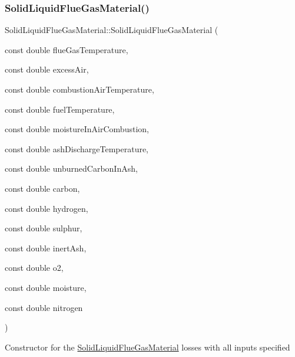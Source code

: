 \subsubsection{\texorpdfstring{Solid\+Liquid\+Flue\+Gas\+Material()}{SolidLiquidFlueGasMaterial()}\hspace{0.1cm}{\footnotesize\ttfamily [2/3]}}
{\footnotesize\ttfamily Solid\+Liquid\+Flue\+Gas\+Material\+::\+Solid\+Liquid\+Flue\+Gas\+Material (\begin{DoxyParamCaption}\item[{const double}]{flue\+Gas\+Temperature,  }\item[{const double}]{excess\+Air,  }\item[{const double}]{combustion\+Air\+Temperature,  }\item[{const double}]{fuel\+Temperature,  }\item[{const double}]{moisture\+In\+Air\+Combustion,  }\item[{const double}]{ash\+Discharge\+Temperature,  }\item[{const double}]{unburned\+Carbon\+In\+Ash,  }\item[{const double}]{carbon,  }\item[{const double}]{hydrogen,  }\item[{const double}]{sulphur,  }\item[{const double}]{inert\+Ash,  }\item[{const double}]{o2,  }\item[{const double}]{moisture,  }\item[{const double}]{nitrogen }\end{DoxyParamCaption})\hspace{0.3cm}{\ttfamily [inline]}}

Constructor for the \hyperlink{class_solid_liquid_flue_gas_material}{Solid\+Liquid\+Flue\+Gas\+Material} losses with all inputs specified


